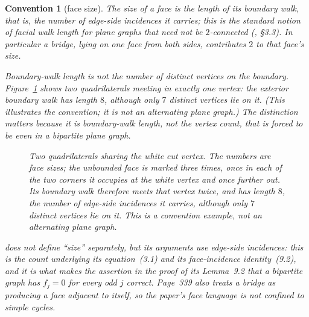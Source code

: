 \documentclass{baustms}
\theoremstyle{cupthm}
\theoremstyle{cupdefn}
\newtheorem{convention}[theorem]{Convention}
\theoremstyle{cuprem}
\begin{document}
\begin{convention}[face size]\label{conv:c1}
The \emph{size} of a face is the length of its boundary walk, that is, the number
of edge-side incidences it carries; this is the standard notion of facial walk
length for plane graphs that need not be $2$-connected
(\cite{MT2001}, \S3.3). In particular a bridge, lying on one face
from both sides, contributes $2$ to that face's size.

Boundary-walk length is not the number of distinct vertices on the boundary.
Figure~\ref{fig:conv} shows two quadrilaterals meeting in exactly one vertex:
the exterior boundary walk has length $8$, although only $7$ distinct vertices
lie on it. (This illustrates the convention; it is not an alternating plane
graph.) The distinction matters because it is boundary-walk length, not the
vertex count, that is forced to be even in a bipartite plane graph.

\begin{figure}[ht]
\centering
{}
\caption{Two quadrilaterals sharing the white cut vertex. The numbers are face
sizes; the unbounded face is marked three times, once in each of the two corners
it occupies at the white vertex and once further out. Its boundary walk
therefore meets that vertex twice, and has length $8$, the number of edge-side
incidences it carries, although only $7$ distinct vertices lie on it. This is a
convention example, not an alternating plane graph.}\label{fig:conv}
\end{figure}

\cite{AHSSV2015} does not define ``size'' separately, but its arguments use
edge-side incidences: this is the count underlying its equation~(3.1) and its
face-incidence identity~(9.2), and it is what makes the assertion in the proof of
its Lemma~9.2 that a bipartite graph has $f_j = 0$ for every odd $j$ correct.
Page~339 also treats a bridge as producing a face adjacent to itself, so the
paper's face language is not confined to simple cycles.
\end{convention}
\end{document}
